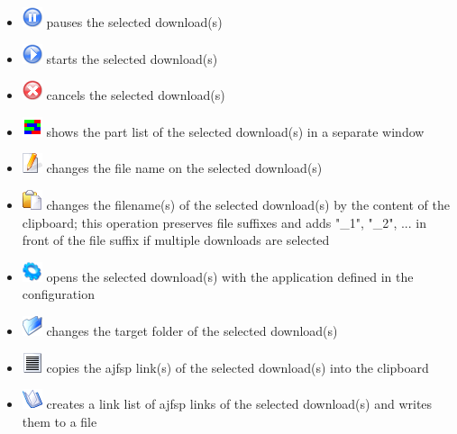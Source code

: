 \documentclass[a4paper,10pt]{book}
\begin{document}
\begin{itemize}
 \item \includegraphics[width=22px]{../player_pause.png} pauses the selected download(s)
 \item \includegraphics[width=22px]{../player_play.png} starts the selected download(s)
 \item \includegraphics[width=22px]{../stop.png} cancels the selected download(s)
 \item \includegraphics[width=22px]{../partlist.png} shows the part list of the selected download(s) in a separate window
 \item \includegraphics[width=22px]{../edit.png} changes the file name on the selected download(s)
 \item \includegraphics[width=22px]{../editpaste.png} changes the filename(s) of the selected download(s) by the content of the clipboard; this operation preserves file suffixes and adds "\_1", "\_2", ... in front of the file suffix if multiple downloads are selected
 \item \includegraphics[width=22px]{../exec.png} opens the selected download(s) with the application defined in the configuration
 \item \includegraphics[width=22px]{../folder_open.png} changes the target folder of the selected download(s)
 \item \includegraphics[width=22px]{../text_block.png} copies the ajfsp link(s) of the selected download(s) into the clipboard
 \item \includegraphics[width=22px]{../toggle_log.png} creates a link list of ajfsp links of the selected download(s) and writes them to a file
\end{itemize}
\end{document}

